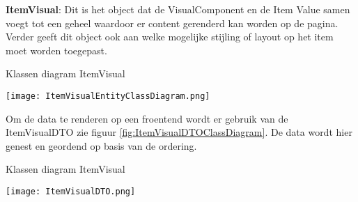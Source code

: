 \whitespace[2]
\textbf{ItemVisual}: Dit is het object dat de VisualComponent en de Item Value samen voegt tot een geheel waardoor er content gerenderd kan worden op de pagina.
Verder geeft dit object ook aan welke mogelijke stijling of layout op het item moet worden toegepast.

\whitespace[2]
\begin{graphic}
	\captionsetup{type=figure}
	\caption{Klassen diagram ItemVisual}
	\texttt{[image: ItemVisualEntityClassDiagram.png]}
	\label{fig:ItemVisualEntityClassDiagram}
\end{graphic}

\whitespace[2]
Om de data te renderen op een froentend wordt er gebruik van de ItemVisualDTO zie figuur \ref{fig:ItemVisualDTOClassDiagram}.
De data wordt hier genest en geordend op basis van de ordering.

\whitespace[2]
\begin{graphic}
	\captionsetup{type=figure}
	\caption{Klassen diagram ItemVisual}
	\texttt{[image: ItemVisualDTO.png]}
	\label{fig:ItemVisualDTOClassDiagram}
\end{graphic}
